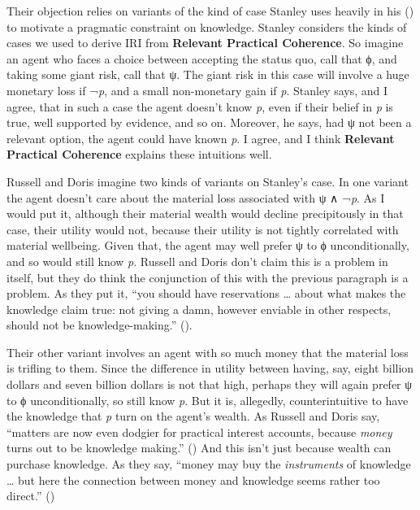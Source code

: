 \documentclass[
  10pt,
  letterpaper,
  DIV=11,
  numbers=noendperiod,
  twoside]{scrartcl}
\begin{document}
Their objection relies on variants of the kind of case Stanley uses
heavily in his () to motivate a
pragmatic constraint on knowledge. Stanley considers the kinds of cases
we used to derive IRI from \textbf{Relevant Practical Coherence}. So
imagine an agent who faces a choice between accepting the status quo,
call that ϕ, and taking some giant risk, call that ψ. The giant risk in
this case will involve a huge monetary loss if ¬\emph{p}, and a small
non-monetary gain if \emph{p}. Stanley says, and I agree, that in such a
case the agent doesn't know \emph{p}, even if their belief in \emph{p}
is true, well supported by evidence, and so on. Moreover, he says, had ψ
not been a relevant option, the agent could have known \emph{p}. I
agree, and I think \textbf{Relevant Practical Coherence} explains these
intuitions well.

Russell and Doris imagine two kinds of variants on Stanley's case. In
one variant the agent doesn't care about the material loss associated
with ψ ∧ ¬\emph{p}. As I would put it, although their material wealth
would decline precipitously in that case, their utility would not,
because their utility is not tightly correlated with material wellbeing.
Given that, the agent may well prefer ψ to ϕ unconditionally, and so
would still know \emph{p}. Russell and Doris don't claim this is a
problem in itself, but they do think the conjunction of this with the
previous paragraph is a problem. As they put it, ``you should have
reservations \ldots{} about what makes the knowledge claim true: not
giving a damn, however enviable in other respects, should not be
knowledge-making.'' ().

Their other variant involves an agent with so much money that the
material loss is trifling to them. Since the difference in utility
between having, say, eight billion dollars and seven billion dollars is
not that high, perhaps they will again prefer ψ to ϕ unconditionally, so
still know \emph{p}. But it is, allegedly, counterintuitive to have the
knowledge that \emph{p} turn on the agent's wealth. As Russell and Doris
say, ``matters are now even dodgier for practical interest accounts,
because \emph{money} turns out to be knowledge making.''
() And this
isn't just because wealth can purchase knowledge. As they say, ``money
may buy the \emph{instruments} of knowledge \ldots{} but here the
connection between money and knowledge seems rather too direct.''
()
\end{document}
